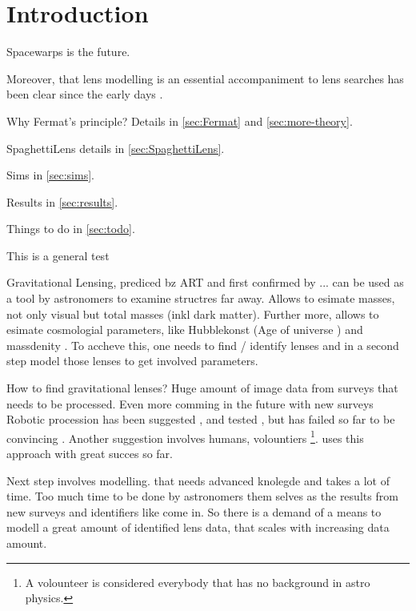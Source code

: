 \section{Introduction}

Spacewarps is the future.\needcite

Moreover, that lens modelling is an essential accompaniment to lens
searches has been clear since the early days \citep{1981ApJ...244..723Y}.

Why Fermat's principle?  Details in \ref{sec:Fermat} and
\ref{sec:more-theory}.

SpaghettiLens details in \ref{sec:SpaghettiLens}.

Sims in \ref{sec:sims}.

\needfig[testfig]

Results in \ref{sec:results}.

Things to do in \ref{sec:todo}.

This is a general test 

\hr


Gravitational Lensing, prediced bz ART and first confirmed by ... can be used as a tool by astronomers to examine structres far away.
Allows to esimate masses, not only visual but total masses (inkl dark matter).
Further more, allows to esimate cosmologial parameters, like Hubblekonst (Age of universe \needcite) and massdenity \needcite.
To accheve this, one needs to find / identify lenses and in a second step model those lenses to get involved parameters.


How to find gravitational lenses? Huge amount of image data from surveys that needs to be processed.
Even more comming in the future with new surveys \needcite
Robotic procession has been suggested \needcite, and tested \needcite, but has failed so far to be convincing \needcite.
Another suggestion involves humans, volountiers \footnote{A volounteer is considered everybody that has no background in astro physics.}.
\sw uses this approach with great succes so far.\needcite


Next step involves modelling. that needs advanced knolegde and takes a lot of time.
Too much time to be done by astronomers them selves as the results from new surveys and identifiers like \sw come in.
So there is a demand of a means to modell a great amount of identified lens data, that scales with increasing data amount.


